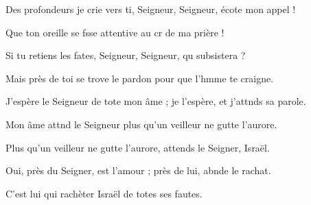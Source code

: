 \item Des profondeurs je crie vers ti, Seigneur,\psstar{} Seigneur, écote mon appel !
\item Que ton oreille se fsse attentive\psstar{} au cr de ma prière !
\item Si tu retiens les fates, Seigneur,\psstar{} Seigneur, qu subsistera ?
\item Mais près de toi se trove le pardon\psstar{} pour que l’hmme te craigne.
\item J’espère le Seigneur de tote mon âme ;\psstar{} je l’espère, et j’attnds sa parole.
\item Mon âme attnd le Seigneur\psstar{} plus qu’un veilleur ne gutte l’aurore.
\item Plus qu’un veilleur ne gutte l’aurore,\psstar{} attends le Seigner, Israël.
\item Oui, près du Seigner, est l’amour ;\psstar{} près de lui, abnde le rachat.
\item C’est lui qui rachèter Israël\psstar{} de totes ses fautes.
